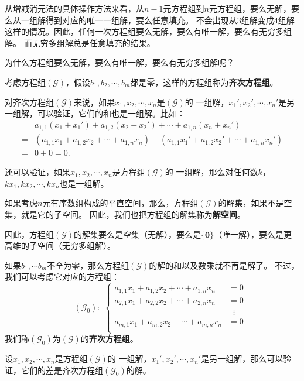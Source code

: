 \documentclass[12pt,UTF8]{ctexbook}
\begin{document}
从增减消元法的具体操作方法来看，从$n-1$元方程组到$n$元方程组，要么无解，要么从一组解得到对应的唯一一组解，要么任意填充。
不会出现从$3$组解变成$4$组解这样的情况。因此，任何一次方程组要么无解，要么有唯一解，要么有无穷多组解。
而无穷多组解总是任意填充的结果。

为什么方程组要么无解，要么有唯一解，要么有无穷多组解呢？

考虑方程组$(\mathcal{G})$，假设$b_1, b_2,\cdots, b_m$都是零，这样的方程组称为\textbf{齐次方程组}。

对齐次方程组$(\mathcal{G})$来说，如果$x_1, x_2, \cdots , x_n$是$(\mathcal{G})$的
一组解，$x_1', x_2', \cdots , x_n'$是另一组解，可以验证，它们的和也是一组解。比如：
\begin{align*}
     & a_{1,1} (x_1 + x_1') + a_{1,2} (x_2 + x_2') + \cdots + a_{1,n} (x_n + x_n') \\
    =& \left(a_{1,1} x_1 + a_{1,2} x_2 + \cdots + a_{1,n} x_n\right) + \left(a_{1,1} x_1' + a_{1,2} x_2' + \cdots + a_{1,n} x_n'\right) \\
    =& 0 + 0 = 0.
\end{align*}

还可以验证，如果$x_1, x_2, \cdots , x_n$是方程组$(\mathcal{G})$的
一组解，那么对任何数$k$，$kx_1, kx_2, \cdots , kx_n$也是一组解。

如果考虑$n$元有序数组构成的平直空间，那么，方程组$(\mathcal{G})$的解集，如果不是空集，就是它的子空间。
因此，我们也把方程组的解集称为\textbf{解空间}。

因此，方程组$(\mathcal{G})$的解集要么是空集（无解），要么是$\{\mathbf{0}\}$（唯一解），要么是更高维的子空间（无穷多组解）。

如果$b_1, \cdots b_m$不全为零，那么方程组$(\mathcal{G})$的解的和以及数乘就不再是解了。
不过，我们可以考虑它对应的方程组：
$$
\qquad (\mathcal{G}_0):\,\,
\left\{
    \begin{aligned}
        a_{1,1} x_1 + a_{1,2} x_2 + \cdots + a_{1,n} x_n &= 0 \\
        a_{2,1} x_1 + a_{2,2} x_2 + \cdots + a_{2,n} x_n &= 0 \\
        &\;\;\vdots \\
        a_{m,1} x_1 + a_{m,2} x_2 + \cdots + a_{m,n} x_n &= 0 \\
    \end{aligned}
\right.
$$
我们称$(\mathcal{G}_0)$为$(\mathcal{G})$的\textbf{齐次方程组}。

设$x_1, x_2, \cdots , x_n$是方程组$(\mathcal{G})$的
一组解，$x_1', x_2', \cdots , x_n'$是另一组解，那么可以验证，它们的差是齐次方程组$(\mathcal{G}_0)$的解。
\end{document}
